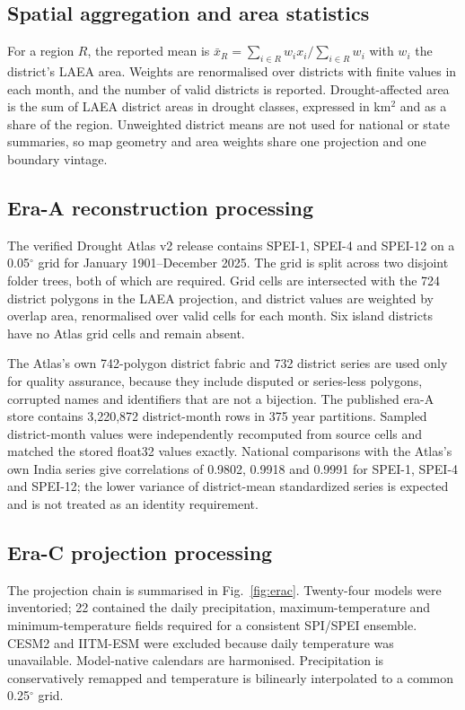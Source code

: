 \documentclass[10pt,a4paper]{article}
\begin{document}
\subsection*{Spatial aggregation and area statistics}
For a region $R$, the reported mean is $\bar{x}_R=\sum_{i\in R} w_i x_i / \sum_{i\in R} w_i$ with $w_i$ the district's LAEA area. Weights are renormalised over districts with finite values in each month, and the number of valid districts is reported. Drought-affected area is the sum of LAEA district areas in drought classes, expressed in km$^2$ and as a share of the region. Unweighted district means are not used for national or state summaries, so map geometry and area weights share one projection and one boundary vintage.

\subsection*{Era-A reconstruction processing}
The verified Drought Atlas v2 release contains SPEI-1, SPEI-4 and SPEI-12 on a 0.05$^\circ$ grid for January 1901--December 2025\citep{ChuphalData2024}. The grid is split across two disjoint folder trees, both of which are required. Grid cells are intersected with the 724 district polygons in the LAEA projection, and district values are weighted by overlap area, renormalised over valid cells for each month. Six island districts have no Atlas grid cells and remain absent.

The Atlas's own 742-polygon district fabric and 732 district series are used only for quality assurance, because they include disputed or series-less polygons, corrupted names and identifiers that are not a bijection. The published era-A store contains 3,220,872 district-month rows in 375 year partitions. Sampled district-month values were independently recomputed from source cells and matched the stored float32 values exactly. National comparisons with the Atlas's own India series give correlations of 0.9802, 0.9918 and 0.9991 for SPEI-1, SPEI-4 and SPEI-12; the lower variance of district-mean standardized series is expected and is not treated as an identity requirement.

\subsection*{Era-C projection processing}
The projection chain is summarised in Fig.~\ref{fig:erac}. Twenty-four models were inventoried; 22 contained the daily precipitation, maximum-temperature and minimum-temperature fields required for a consistent SPI/SPEI ensemble. CESM2 and IITM-ESM were excluded because daily temperature was unavailable. Model-native calendars are harmonised. Precipitation is conservatively remapped and temperature is bilinearly interpolated to a common 0.25$^\circ$ grid.
\end{document}

